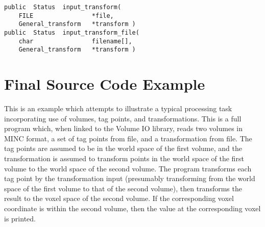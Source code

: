 
{\bf\begin{verbatim}
public  Status  input_transform(
    FILE                *file,
    General_transform   *transform )
public  Status  input_transform_file(
    char                filename[],
    General_transform   *transform )
\end{verbatim}}


\chapter{Final Source Code Example}

This is an example which attempts to illustrate a typical processing
task incorporating use of volumes, tag points, and transformations.
This is a full program which, when linked to the Volume IO library,
reads two volumes in MINC format, a set of tag points from file, and a
transformation from file.  The tag points are assumed to be in the
world space of the first volume, and the transformation is assumed to
transform points in the world space of the first volume to the world
space of the second volume.  The program transforms each tag point by
the transformation input (presumably transforming from the world space
of the first volume to that of the second volume), then transforms the
result to the voxel space of the second volume.  If the corresponding
voxel coordinate is within the second volume, then the value at the
corresponding voxel is printed.

